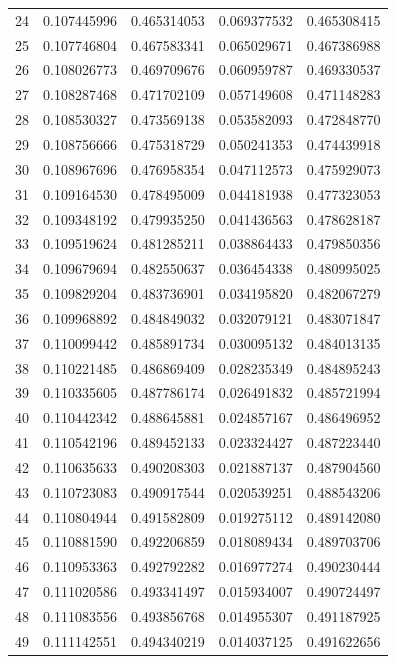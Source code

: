\begin{tabular}{rcccc}
24 & 0.107445996 & 0.465314053 & 0.069377532 & 0.465308415 \\
25 & 0.107746804 & 0.467583341 & 0.065029671 & 0.467386988 \\
26 & 0.108026773 & 0.469709676 & 0.060959787 & 0.469330537 \\
27 & 0.108287468 & 0.471702109 & 0.057149608 & 0.471148283 \\
28 & 0.108530327 & 0.473569138 & 0.053582093 & 0.472848770 \\
29 & 0.108756666 & 0.475318729 & 0.050241353 & 0.474439918 \\
30 & 0.108967696 & 0.476958354 & 0.047112573 & 0.475929073 \\
31 & 0.109164530 & 0.478495009 & 0.044181938 & 0.477323053 \\
32 & 0.109348192 & 0.479935250 & 0.041436563 & 0.478628187 \\
33 & 0.109519624 & 0.481285211 & 0.038864433 & 0.479850356 \\
34 & 0.109679694 & 0.482550637 & 0.036454338 & 0.480995025 \\
35 & 0.109829204 & 0.483736901 & 0.034195820 & 0.482067279 \\
36 & 0.109968892 & 0.484849032 & 0.032079121 & 0.483071847 \\
37 & 0.110099442 & 0.485891734 & 0.030095132 & 0.484013135 \\
38 & 0.110221485 & 0.486869409 & 0.028235349 & 0.484895243 \\
39 & 0.110335605 & 0.487786174 & 0.026491832 & 0.485721994 \\
40 & 0.110442342 & 0.488645881 & 0.024857167 & 0.486496952 \\
41 & 0.110542196 & 0.489452133 & 0.023324427 & 0.487223440 \\
42 & 0.110635633 & 0.490208303 & 0.021887137 & 0.487904560 \\
43 & 0.110723083 & 0.490917544 & 0.020539251 & 0.488543206 \\
44 & 0.110804944 & 0.491582809 & 0.019275112 & 0.489142080 \\
45 & 0.110881590 & 0.492206859 & 0.018089434 & 0.489703706 \\
46 & 0.110953363 & 0.492792282 & 0.016977274 & 0.490230444 \\
47 & 0.111020586 & 0.493341497 & 0.015934007 & 0.490724497 \\
48 & 0.111083556 & 0.493856768 & 0.014955307 & 0.491187925 \\
49 & 0.111142551 & 0.494340219 & 0.014037125 & 0.491622656 \\

\end{tabular}
